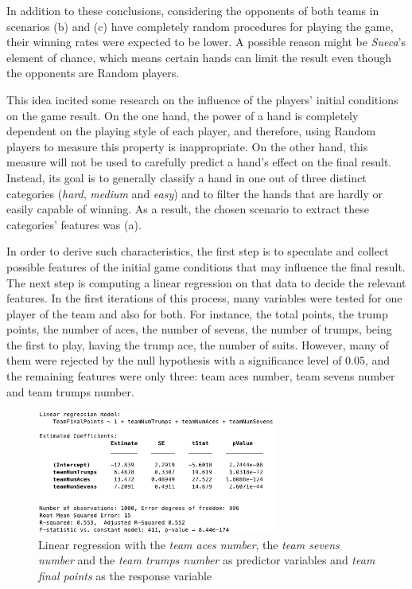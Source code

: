 In addition to these conclusions, considering the opponents of both teams in scenarios (b) and (c) have completely random procedures for playing the game, their winning rates were expected to be lower.
A possible reason might be \emph{Sueca}'s element of chance, which means certain hands can limit the result even though the opponents are Random players.

This idea incited some research on the influence of the players' initial conditions on the game result.
On the one hand, the power of a hand is completely dependent on the playing style of each player, and therefore, using Random players to measure this property is inappropriate.
On the other hand, this measure will not be used to carefully predict a hand's effect on the final result.
Instead, its goal is to generally classify a hand in one out of three distinct categories (\emph{hard}, \emph{medium} and \emph{easy}) and to filter the hands that are hardly or easily capable of winning.
As a result, the chosen scenario to extract these categories' features was (a).

In order to derive such characteristics, the first step is to speculate and collect possible features of the initial game conditions that may influence the final result.
The next step is computing a linear regression on that data to decide the relevant features.
In the first iterations of this process, many variables were tested for one player of the team and also for both.
For instance, the total points, the trump points, the number of aces, the number of sevens, the number of trumps, being the first to play, having the trump ace, the number of suits.
However, many of them were rejected by the null hypothesis with a significance level of 0.05, and the remaining features were only three: team aces number, team sevens number and team trumps number.

\begin{figure}[h!]
  \centering
    \includegraphics[width=0.7\textwidth]{./img/4/linearRegression}
  \caption{Linear regression with the \emph{team aces number}, the \emph{team sevens number} and the \emph{team trumps number} as predictor variables and \emph{team final points} as the response variable}
\label{fig:linearRegression}
\end{figure}

